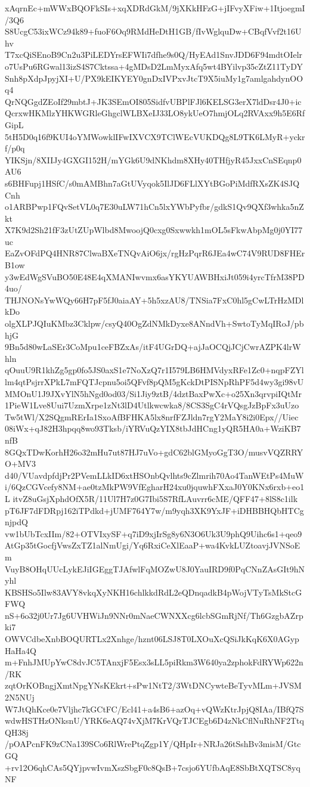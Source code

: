 xAqrnEc+mWWxBQOFkSIs+xqXDRdGkM/9jXKkHFzG+jIFvyXFiw+1ItjoegmI/3Q6
S8UcgC53ixWCz94k89+fuoF6Oq9RMdHeDtH1GB/fIvWglquDw+CBqfVvf2t16Uhv
T7xcQiSEnoB9Cn2u3PiLEDYrsEFWIi7dfhe9s0Q/HyEAd1SnvJDD6F94mdtOIelr
o7UsPu6RGwal13izS4S7Cktssa+4gMDsD2LmMyxAfq5wt4BYilvp35cZtZ11TyDY
Snh8pXdpJpyjXI+U/PX9kEIKYEY0gnDxIVPxvJtcT9X5iuMy1g7amlgahdynOOq4
QrNQGgdZEoIf29mbtJ+JK3SEmOI805SidfvUBPlFJl6KELSG3erX7ldDsr4J0+ic
QcrxwHKMlzYHKWGRleGhgclWLBXeIJ33LO8ykUeO7hmjOLq2RVAxx9h5E6RfGipL
5tH5D0q16f9KUI4oYMWowklIFwIXVCX9TClWEcVUKDQg8L9TK6LMyR+yckrf/p0q
YIKSjn/8XIIJy4GXGI152H/mYGk6U9dNKhdm8XHy40THfjyR45JxxCnSEqnp0AU6
s6BHFupj1HSfC/s0mAMBhn7aGtUVyqok5IlJD6FLlXYtBGoPiMdfRXsZK4SJQCnh
o1ARBPwp1FQvSetVL0q7E30uLW71hCn5lxYWbPyfbr/gdkS1Qv9QXf3whka5nZkt
X7K9d2Sh21fF3zUtZUpWlbd8MwoojQ0cxg0Sxwwkh1mOL5sFkwAbpMg0j0YI77uc
EaZvOFdPQ4HNR87ClwaBXeTNQvAiO6jx/rgHzPqrR6JEa4wC74V9RUD8FHErB1ow
y3wEdWgSVuBO50E48E4qXMANIwvmx6asYKYUAWBHxiJt059i4yrcTfrM38PD4uo/
THJNONsYwWQy66H7pF5fJ0aiaAY+5h5xzAU8/TNSia7FxC0hl5gCwLTrHzMDlkDo
olgXLPJQIuKMbz3Cklpw/csyQ40OgZdNMkDyxe8ANndVh+SwtoTyMqIRoJ/pbhjG
9Bn5d80wLaSEr3CoMpu1ceFBZxAs/itF4UGrDQ+ajJaOCQjJCjCwrAZPK4lrWhln
qOuuU9R1khZg5gp0fo5JS0axS1e7NoXzQ7r1I579LB6HMVdyxRFe1Zc0+nqpFZYl
lm4qtPsjrrXPkL7mFQTJcpnu5oi5QFvf8pQM5gKckDtPISNpRhPF5d4wy3gi98vU
MMOnU1J9JXvYlN5hNgd0od03/Si1Jiy9ztB/4dztBaxPwXc+o25Xn3qrvpiIQtMr
1PieW1Lve8Uui7UzmXrpe1zNt3lD4Utlkwcwka8/8CS3SgC4rVQsgJzBpFx3uUzo
Tw5tWl/X2SQgmRErIa1SxoAfBFHKA5lx8nrfFZJldn7rgY2MaY8i2i0Epx//Uiec
08iWx+qJ82H3hpqq8wo93Tksb/iYRVuQzYIX8tbJdHCng1yQR5HA0a+WziKB7nfB
8GQxTDwKorhH26o32mHu7ut87HJ7uVo+gdC62blGMyoGgT3O/musvVQZRRYO+MV3
d40/VUavdpfdjPr2PVemLLkID6xtHSOnbQvlhts9cZlmrih70Ao4TanWEtPs4MuW
i/6QzCGVcefy8NM+ae0tzMkPW9VfEgharH24xu0jquwhFXxaJ0Y0KNx6rxb+eo1L
itvZ8uGsjXphdOfX5R/11Ul7H7z0G7Ibi5S7RfLAuvrr6cME/QFF47+8lS8c1ilk
pT6JF7dFDRpj162iTPdkd+jUMF764Y7w/m9yqh3XK9YxJF+iDHBBHQbHTCgnjpdQ
vw1bUbTcxIIm/82+OTVIxySF+q7iD9xjIrSg8y6N3O6Uk3U9phQ9Uihc6s1+qeo9
AtGp35tGocfjVwsZxTZ1alNmUgi/Yq6RxiCeXlEaaP+wa4KvkLUZtoavjJVNSoEm
VuyB8OHqUUcLykEJiIGEggTJAfwlFqMOZwU8J0YauIRD9f0PqCNnZAsGIt9hNyhl
KBSHSo5Ilw83AVY8vkqXyNKH16chlkkdRdL2eQDnqadkB4pWojVTyTsMkStcGFWQ
nS+6o32j0Ur7Jg6UVHWiJn9NNr0mNaeCWNXXcg6lcbSGmRjNf/Th6GzgbAZrpki7
OWVCdbeXnbBOQURTLx2Xnhge/hznt06LSJ8T0LXOuXcQSiJkKqK6X0AGypHaHa4Q
m+FnhJMUpYwC8dvJC5TAnxjF5Esx3sLL5piRkm3W640ya2zphokFdRYWp622n/RK
zqtOrKOBngjXmtNpgYNsKEkrt+sPw1NtT2/3WtDNCywteBeTyvMLm+JVSM2N5NUj
W7JtQhKce0e7Vljhc7kGCtFC/Ecl41+a4sB6+azOq+vQWzKtrJpjQ8IAa/IBfQ7S
wdwHSTHzONksnU/YRK6eAQ74vXjM7KrVQrTJCEgb6D4zNkCflNuRhNF2TtqQH38j
/pOAPcnFK9zCNa139SCo6RlWrePtqZgp1Y/QHpIr+NRJa26tSshBv3misM/GtcGQ
+rv12O6qhCAs5QYjpvwIvmXszSbgF0c8QsB+7csjo6YUfbAqE8SbBtXQTSC8yqNF

